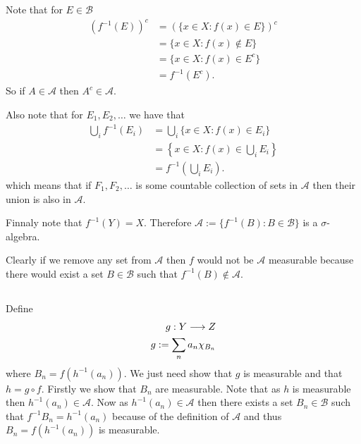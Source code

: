 \documentclass{unswmaths}
\begin{document}
\section{}
\subsection{}
Note that for $ E \in \mathcal{B} $
\begin{align*}
    \left(f^{-1}(E)\right)^c &= \left(\{ x \in X : f(x) \in E \}\right)^c \\
    &= \{ x \in X : f(x) \not\in E \} \\
    &= \{ x \in X : f(x) \in E^c \} \\
    &= f^{-1}(E^c).
\end{align*}
So if $ A \in \mathcal{A} $ then $ A^c \in \mathcal{A} $.

Also note that for $ E_1, E_2, \ldots $ 
we have that
\begin{align*}
    \bigcup_{i} f^{-1}(E_i) &= \bigcup_{i} \{ x \in X : f(x) \in E_i \} \\
        &= \left\{ x \in X : f(x) \in \bigcup_i E_i \right\} \\
        &= f^{-1}\left(\bigcup_i E_i \right).
\end{align*}
which means that if $ F_1, F_2, \ldots $ is some countable collection of sets in $ \mathcal{A} $ then their union is also in $ \mathcal{A} $.

Finnaly note that $ f^{-1}(Y) = X $. Therefore $ \mathcal{A} := \{ f^{-1}(B) : B \in \mathcal{B} \} $ is a $ \sigma$-algebra. 

Clearly if we remove any set from $ \mathcal{A} $ then $ f $ would not be $ \mathcal{A} $ measurable because there would exist a set $ B \in \mathcal{B} $ such that $ f^{-1}(B) \not\in \mathcal{A} $. 

\subsection{}
Define
\begin{align*}
    g : Y \longrightarrow Z \\
    g := \sum_{n} a_n \chi_{B_n}
\end{align*}
where $ B_n = f(h^{-1}(a_n)) $.
We just need show that $ g $ is measurable and that $ h = g \circ f $.
Firstly we show that $ B_n$ are measurable.
Note that as $ h $ is measurable then $ h^{-1}(a_n) \in \mathcal{A} $. Now as $ h^{-1}(a_n) \in \mathcal{A} $ then there exists a set $ B_n \in \mathcal{B} $ such that
$ f^{-1} B_n = h^{-1}(a_n) $ because of the definition of $ \mathcal{A} $ and thus $ B_n = f(h^{-1}(a_n)) $ is measurable. 
\end{document}
